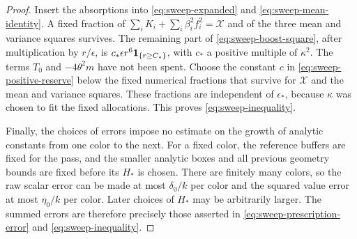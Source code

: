 \begin{proof}
Insert the absorptions into \eqref{eq:sweep-expanded} and
\eqref{eq:sweep-mean-identity}.  A fixed fraction of
\(\sum_iK_i+\sum_i\beta_i^2f_i^2=\mathcal X\) and of the
three mean and variance squares survives.  The remaining
part of \eqref{eq:sweep-boost-square}, after multiplication
by \(r/\epsilon\), is
\(c_*\epsilon r^6\mathbf 1_{\{r\ge C_*\}}\), with
\(c_*\) a positive multiple of \(\kappa^2\).
The terms \(T_0\) and \(-4\theta^2m\) have not been spent.
Choose the constant \(c\) in \eqref{eq:sweep-positive-reserve}
below the fixed numerical fractions that survive for \(\mathcal X\)
and the mean and variance squares.  These fractions are independent
of \(\epsilon_*\), because \(\kappa\) was chosen to fit the fixed
allocations.
This proves \eqref{eq:sweep-inequality}.

Finally, the choices of errors impose no estimate on the
growth of analytic constants from one color to the next.
For a fixed color, the reference buffers are fixed for the
pass, and the smaller analytic boxes and all previous
geometry bounds are fixed before its \(H_*\) is chosen.
There are finitely many colors, so the raw scalar error can
be made at most \(\delta_0/k\) per color and the squared
value error at most \(\eta_0/k\) per color.  Later choices
of \(H_*\) may be arbitrarily larger.  The summed errors
are therefore precisely those asserted in
\eqref{eq:sweep-prescription-error} and
\eqref{eq:sweep-inequality}.
\end{proof}
